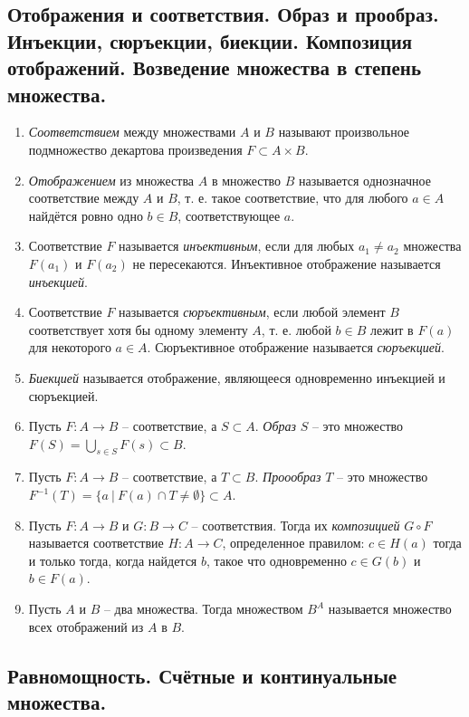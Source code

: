\subsection{Отображения и соответствия. Образ и прообраз. Инъекции, сюръекции, биекции. Композиция отображений. Возведение множества в степень множества.}

\begin{enumerate}
    \item \textit{Соответствием} между множествами $A$ и $B$ называют произвольное подмножество декартова произведения $F \subset A \times B$.
    \item \textit{Отображением} из множества $A$ в множество $B$ называется однозначное соответствие между $A$ и $B$, т. е. такое соответствие, что для любого $a \in A$ найдётся ровно одно $b \in B$, соответствующее $a$.
    \item Соответствие $F$ называется \textit{инъективным}, если для любых $a_1 \neq a_2$ множества $F(a_1)$ и $F(a_2)$ не пересекаются. Инъективное отображение называется \textit{инъекцией}.
    \item Соответствие $F$ называется \textit{сюръективным}, если любой элемент $B$ соответствует хотя бы одному элементу $A$, т. е. любой $b \in B$ лежит в $F(a)$ для некоторого $a \in A$. Сюръективное отображение называется \textit{сюръекцией}.
    \item \textit{Биекцией} называется отображение, являющееся одновременно инъекцией и сюръекцией.
    \item Пусть $F: A \rightarrow B$ -- соответствие, а $S \subset A$. \textit{Образ} $S$ -- это множество $F(S) = \bigcup_{s \in S} F(s) \subset B$.
    \item Пусть $F: A \rightarrow B$ -- соответствие, а $T \subset B$. \textit{Проообраз} $T$ -- это множество $F^{-1}(T) = \{a \ | \ F(a) \cap T \neq \emptyset\} \subset A$.
    \item Пусть $F: A \to B$ и $G: B \to C$ -- соответствия. Тогда их \textit{композицией} $G \circ F$ называется соответствие $H: A \to C$, определенное правилом: $c \in H(a)$ тогда и только тогда, когда найдется $b$, такое что одновременно $c \in G(b)$ и $b \in F(a)$.
    \item Пусть $A$ и $B$ -- два множества. Тогда множеством $B^A$ называется множество всех отображений из $A$ в $B$.
\end{enumerate}

\subsection{Равномощность. Счётные и континуальные множества.}

